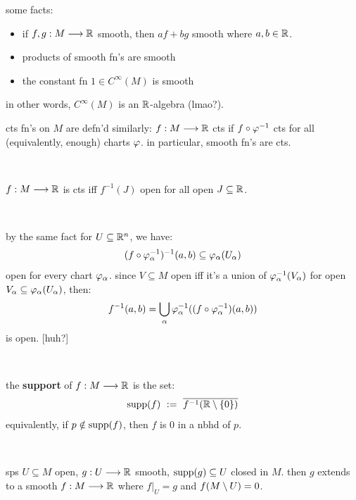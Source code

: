 some facts:
\begin{itemize}
	\item if $f,g:M\longrightarrow\mathbb{R}$ smooth, then $af+bg$ smooth where $a,b\in\mathbb{R}$.
	\item products of smooth fn's are smooth
	\item the constant fn $1\in C^{\infty}(M)$ is smooth
\end{itemize}
in other words, $C^{\infty}(M)$ is an $\mathbb{R}$-algebra (lmao?).

\begin{defn}
    cts fn's on $M$ are defn'd similarly:
	$f:M\longrightarrow\mathbb{R}$ cts if $f\circ\varphi^{-1}$ cts for all (equivalently, enough) charts $\varphi$.
	in particular, smooth fn's are cts.
\end{defn} \

\begin{prop}
    $f:M\longrightarrow\mathbb{R}$ is cts iff $f^{-1}(J)$ open for all open $J\subseteq\mathbb{R}$.
\end{prop} \

\begin{pf}[source=Primary Source Material]
	by the same fact for $U\subseteq\mathbb{R}^{n}$, we have:
	\begin{equation*}
		(f\circ\varphi_{\alpha}^{-1})^{-1}(a,b) \subseteq \varphi_{\alpha}(U_{\alpha})
	\end{equation*}
	open for every chart $\varphi_{\alpha}$.
	since $V\subseteq M$ open iff it's a union of $\varphi_{\alpha}^{-1}(V_{\alpha})$
	for open $V_{\alpha}\subseteq\varphi_{\alpha}(U_{\alpha})$, then:
	\begin{equation*}
	    f^{-1}(a,b)=\bigcup_{\alpha}
		\varphi_{\alpha}^{-1}((f\circ\varphi_{\alpha}^{-1})(a,b))
	\end{equation*}
	is open. [huh?]
\end{pf} \

\begin{defn}
    the \textbf{support} of $f:M\longrightarrow\mathbb{R}$ is the set:
	\begin{equation*}
	    \supp(f) \ := \ \bar{f^{-1}(\bR\sm\set{0})}
	\end{equation*}
	equivalently, if $p\notin\operatorname{supp}(f)$, then $f$ is 0 in a nbhd of $p$.
\end{defn} \

\begin{lm}
    sps $U\subseteq M$ open, $g:U\longrightarrow\mathbb{R}$ smooth, $\operatorname{supp}(g)\subseteq U$
	closed in $M$.
	then $g$ extends to a smooth $f:M\longrightarrow\mathbb{R}$ where
	$f\big\rvert_{U}=g$ and $f(M\setminus U)=0$.
\end{lm} \


